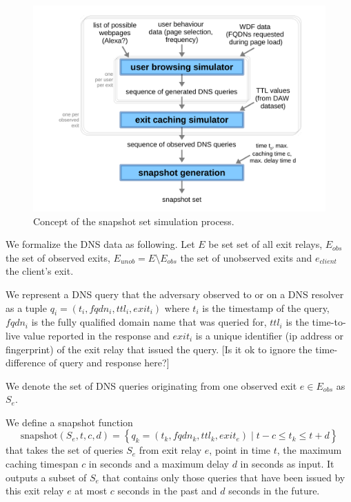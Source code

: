 \begin{figure}[t]
	\centering
	\includegraphics[width=\linewidth]{figures/snapshot-simulator-concept.pdf}
	\caption{Concept of the snapshot set simulation process.}
	\label{fig:snapshot-simulator-concept}
\end{figure}


We formalize the DNS data as following. 
%
Let $E$ be set set of all exit relays, $E_{obs}$ the set of observed
exits, $E_{unob} = E \setminus E_{obs}$ the set of unobserved exits and
$e_{client}$ the client's exit.

We represent a DNS query that the adversary observed to or on a DNS
resolver as a tuple $q_i = (t_i, fqdn_i, ttl_i, exit_i)$ where $t_i$ is
the timestamp of the query, $fqdn_i$ is the fully qualified domain name
that was queried for, $ttl_i$ is the time-to-live value reported in the
response and $exit_i$ is a unique identifier (\eg ip address or
fingerprint) of the exit relay that issued the query.
[Is it ok to ignore the time-difference of query and response here?]

We denote the set of DNS queries originating from one observed exit $e
\in E_{obs}$ as $S_{e}$.

We define a snapshot function 
\begin{equation}
  \label{equ:snapshot}
  \mathrm{snapshot}(S_e,t,c,d) = \left\{q_k = (t_k,fqdn_k,ttl_k,exit_e)
		  \mid t-c \leq t_k \leq t+d \right\}
\end{equation}
that takes the set of queries $S_e$ from exit relay $e$, point in time
$t$, the maximum caching timespan $c$ in seconds and a maximum delay $d$
in seconds as input. It outputs a subset of $S_e$ that contains only
those queries that have been issued by this exit relay $e$ at most $c$
seconds in the past and $d$ seconds in the future.

